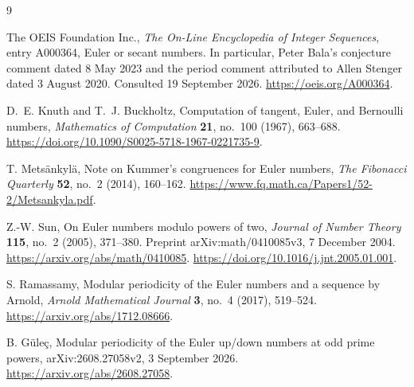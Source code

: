 \documentclass[11pt,a4paper]{article}
\numberwithin{equation}{section}
\theoremstyle{definition}
\begin{document}
\begin{thebibliography}{9}
The OEIS Foundation Inc., \emph{The On-Line Encyclopedia of Integer
Sequences}, entry A000364, Euler or secant numbers. In particular,
Peter Bala's conjecture comment dated 8 May 2023 and the period comment
attributed to Allen Stenger dated 3 August 2020. Consulted
19 September 2026. \url{https://oeis.org/A000364}.

D.~E. Knuth and T.~J. Buckholtz,
Computation of tangent, Euler, and Bernoulli numbers,
\emph{Mathematics of Computation} \textbf{21}, no.~100 (1967), 663--688.
\url{https://doi.org/10.1090/S0025-5718-1967-0221735-9}.

T. Mets\"ankyl\"a,
Note on Kummer's congruences for Euler numbers,
\emph{The Fibonacci Quarterly} \textbf{52}, no.~2 (2014), 160--162.
\url{https://www.fq.math.ca/Papers1/52-2/Metsankyla.pdf}.

Z.-W. Sun,
On Euler numbers modulo powers of two,
\emph{Journal of Number Theory} \textbf{115}, no.~2 (2005), 371--380.
Preprint arXiv:math/0410085v3, 7 December 2004.
\url{https://arxiv.org/abs/math/0410085}.
\url{https://doi.org/10.1016/j.jnt.2005.01.001}.

S. Ramassamy,
Modular periodicity of the Euler numbers and a sequence by Arnold,
\emph{Arnold Mathematical Journal} \textbf{3}, no.~4 (2017), 519--524.
\url{https://arxiv.org/abs/1712.08666}.

B. G\"ule\c{c},
Modular periodicity of the Euler up/down numbers at odd prime powers,
arXiv:2608.27058v2, 3 September 2026.
\url{https://arxiv.org/abs/2608.27058}.
\end{thebibliography}
\end{document}
